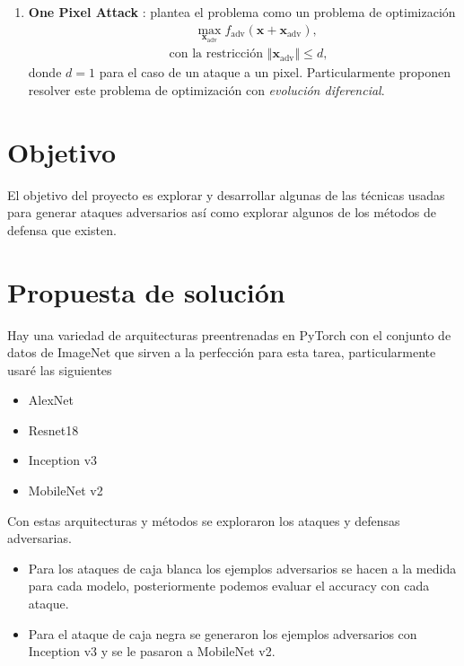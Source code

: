 \documentclass[10pt]{article}
\begin{document}
\begin{multicols*}{2}
\begin{enumerate}
\item \textbf{One Pixel Attack} \cite{OnePixel}: plantea el problema como un problema de optimización
%
\begin{align*}
	& \hspace{2em} \max_{\bm{x}_{\text{adv}}} f_{\text{adv}} (\bm{x} + \bm{x}_{\text{adv}}), \\
	& \text{con la restricción } \left\Vert \bm{x}_{\text{adv}} \right\Vert \leq d,
\end{align*}
%
donde $d = 1$ para el caso de un ataque a un pixel. Particularmente proponen resolver este problema de optimización con \emph{evolución diferencial}.

\end{enumerate}

\section{Objetivo}

El objetivo del proyecto es explorar y desarrollar algunas de las técnicas usadas para generar ataques adversarios así como explorar algunos de los métodos de defensa que existen.

\section{Propuesta de solución}

Hay una variedad de arquitecturas preentrenadas en PyTorch con el conjunto de datos de ImageNet que sirven a la perfección para esta tarea, particularmente usaré las siguientes

\begin{itemize}
	\item AlexNet
	\item Resnet18
	\item Inception v3
	\item MobileNet v2
\end{itemize}

Con estas arquitecturas y métodos se exploraron los ataques y defensas adversarias.

\begin{itemize}
\item Para los ataques de caja blanca los ejemplos adversarios se hacen a la medida para cada modelo, posteriormente podemos evaluar el accuracy con cada ataque.

\item Para el ataque de caja negra se generaron los ejemplos adversarios con Inception v3 y se le pasaron a MobileNet v2.


\end{itemize}
\end{multicols*}
\end{document}

